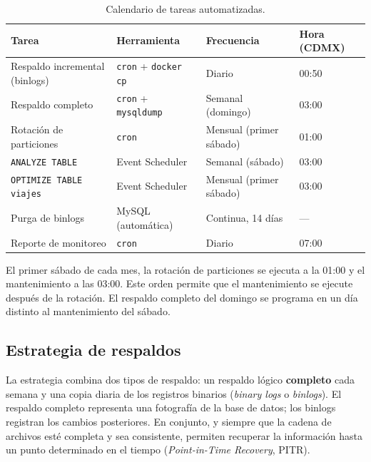 \documentclass[10pt,a4paper]{article}
\begin{document}
\begin{table}[htbp]
    \centering
    \small
    \begin{tabular}{|p{4.2cm}|p{3.2cm}|p{3.6cm}|p{2cm}|}
        \hline
        \textbf{Tarea} & \textbf{Herramienta} & \textbf{Frecuencia} & \textbf{Hora (CDMX)} \\ \hline
        Respaldo incremental (binlogs) & \texttt{cron} + \texttt{docker cp} & Diario & 00:50 \\ \hline
        Respaldo completo & \texttt{cron} + \texttt{mysqldump} & Semanal (domingo) & 03:00 \\ \hline
        Rotación de particiones & \texttt{cron} & Mensual (primer sábado) & 01:00 \\ \hline
        \texttt{ANALYZE TABLE} & Event Scheduler & Semanal (sábado) & 03:00 \\ \hline
        \texttt{OPTIMIZE TABLE viajes} & Event Scheduler & Mensual (primer sábado) & 03:00 \\ \hline
        Purga de binlogs & MySQL (automática) & Continua, 14 días & --- \\ \hline
        Reporte de monitoreo & \texttt{cron} & Diario & 07:00 \\ \hline
    \end{tabular}
    \caption{Calendario de tareas automatizadas.}
    \label{tab:calendario-operativo}
\end{table}

El primer sábado de cada mes, la rotación de particiones se ejecuta a la 01:00 y el mantenimiento a las 03:00. Este orden permite que el mantenimiento se ejecute después de la rotación. El respaldo completo del domingo se programa en un día distinto al mantenimiento del sábado.

\newpage

\subsection{Estrategia de respaldos}

La estrategia combina dos tipos de respaldo: un respaldo lógico \textbf{completo} cada semana y una copia diaria de los registros binarios (\textit{binary logs} o \textit{binlogs}). El respaldo completo representa una fotografía de la base de datos; los binlogs registran los cambios posteriores. En conjunto, y siempre que la cadena de archivos esté completa y sea consistente, permiten recuperar la información hasta un punto determinado en el tiempo (\textit{Point-in-Time Recovery}, PITR).
\end{document}
